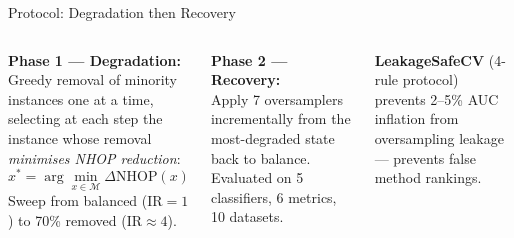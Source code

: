 \documentclass[aspectratio=169,10pt]{beamer}
\newcommand{\NHOP}{\mathrm{NHOP}}
\newcommand{\IR}{\mathrm{IR}}
\begin{document}
\begin{frame}{Protocol: Degradation then Recovery}
\begin{columns}[T]
\textbf{Phase 1 — Degradation:}\\
Greedy removal of minority instances one at a time, selecting at each step the instance whose removal \emph{minimises NHOP reduction}:
\[
  x^* = \arg\min_{x \in \mathcal{M}} \Delta\NHOP(x)
\]
Sweep from balanced ($\IR=1$) to 70\% removed ($\IR\approx4$).

\vspace{8pt}
\textbf{Phase 2 — Recovery:}\\
Apply 7 oversamplers incrementally from the most-degraded state back to balance. Evaluated on 5 classifiers, 6 metrics, 10 datasets.

\vspace{6pt}
\textbf{LeakageSafeCV} (4-rule protocol) prevents 2--5\% AUC inflation from oversampling leakage — prevents false method rankings.

\end{columns}
\end{frame}
\end{document}
